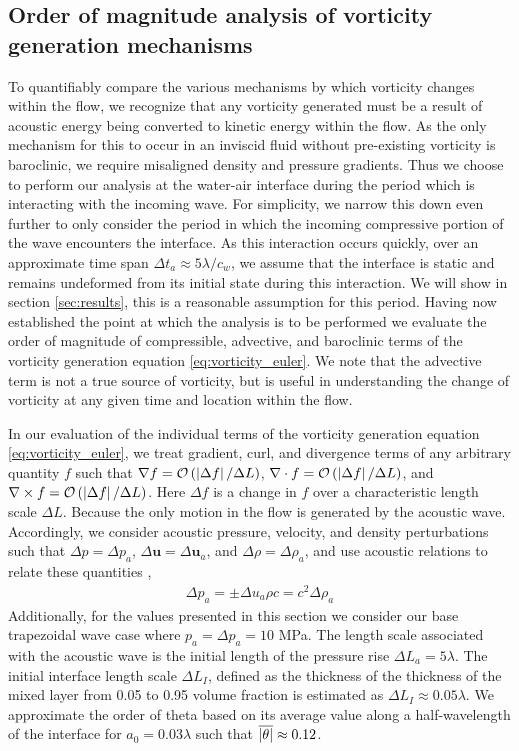 \subsection{Order of magnitude analysis of vorticity generation mechanisms}
To quantifiably compare the various mechanisms by which vorticity
changes within the flow, we recognize that any vorticity generated
must be a result of acoustic energy being converted to kinetic energy
within the flow. As the only mechanism for this to occur in an
inviscid fluid without pre-existing vorticity is baroclinic, we
require misaligned density and pressure gradients. Thus we choose to
perform our analysis at the water-air interface during the period
which is interacting with the incoming wave. For simplicity, we narrow
this down even further to only consider the period in which the
incoming compressive portion of the wave encounters the interface. As
this interaction occurs quickly, over an approximate time span
$\Delta t_a\approx5\lambda/c_{w}$, we assume that the interface is
static and remains undeformed from its initial state during this
interaction. We will show in section \ref{sec:results}, this is a
reasonable assumption for this period. Having now established the
point at which the analysis is to be performed we evaluate the order
of magnitude of compressible, advective, and baroclinic terms of the
vorticity generation equation \eqref{eq:vorticity_euler}. We note that
the advective term is not a true source of vorticity, but is useful in
understanding the change of vorticity at any given time and location
within the flow.

In our evaluation of the individual terms of the vorticity generation
equation \eqref{eq:vorticity_euler}, we treat gradient, curl, and
divergence terms of any arbitrary quantity $f$ such that
$\nabla f= \mathcal{O}\left(\left|\Delta f\right|/\Delta L\right)$,
$\nabla\cdot f=\mathcal{O}\left(\left|\Delta f\right|/\Delta L\right)$, and
$\nabla\times f=\mathcal{O}\left(\left|\Delta f\right|/\Delta L\right)$. Here
$\Delta f$ is a change in $f$ over a characteristic length scale
$\Delta L$. Because the only motion in the flow is generated by the
acoustic wave. Accordingly, we consider acoustic pressure, velocity,
and density perturbations such that $\Delta p=\Delta p_a$,
$\Delta \boldsymbol{u}=\Delta \boldsymbol{u}_a$, and $\Delta \rho=\Delta \rho_a$,
and use acoustic relations to relate these quantities
\citep{Anderson1990},
\begin{align}%
  \label{eq:acoustic_relations}%
  \Delta p_a=\pm\Delta u_a \rho c=c^2\Delta \rho_a%
\end{align}
Additionally, for the values presented in this section we consider our base
trapezoidal wave case where $p_a = \Delta p_a = 10$ MPa. The length
scale associated with the acoustic wave is the initial length of the
pressure rise $\Delta L_a=5\lambda$. The initial interface length
scale $\Delta L_I$, defined as the thickness of the thickness of the
mixed layer from 0.05 to 0.95 volume fraction is estimated as
$\Delta L_I \approx 0.05\lambda$. We approximate the order of theta
based on its average value along a half-wavelength of the interface
for $a_0=0.03\lambda$ such that $\overline{\left|\theta\right|}\approx0.12$.

